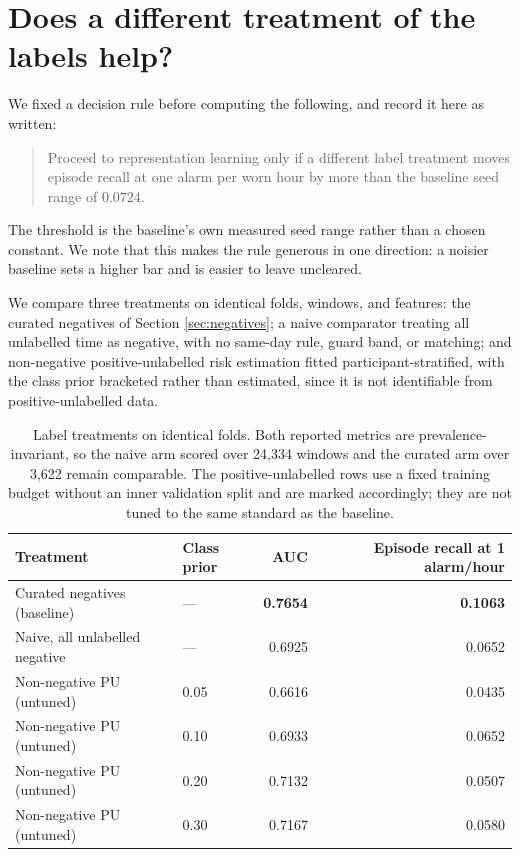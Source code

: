 \documentclass{article}
\begin{document}
\section{Does a different treatment of the labels help?}
\label{sec:pu}

We fixed a decision rule before computing the following, and record it here as
written:

\begin{quote}
Proceed to representation learning only if a different label treatment moves
episode recall at one alarm per worn hour by more than the baseline seed range
of $0.0724$.
\end{quote}

The threshold is the baseline's own measured seed range rather than a chosen
constant. We note that this makes the rule generous in one direction: a noisier
baseline sets a higher bar and is easier to leave uncleared.

We compare three treatments on identical folds, windows, and features: the
curated negatives of Section \ref{sec:negatives}; a naive comparator treating
all unlabelled time as negative, with no same-day rule, guard band, or
matching; and non-negative positive-unlabelled risk estimation
\cite{kiryo2017} fitted participant-stratified, with the class prior bracketed
rather than estimated, since it is not identifiable from positive-unlabelled
data.

\begin{table}[t]
\caption{Label treatments on identical folds. Both reported metrics are
prevalence-invariant, so the naive arm scored over 24{,}334 windows and the
curated arm over 3{,}622 remain comparable. The positive-unlabelled rows use a
fixed training budget without an inner validation split and are marked
accordingly; they are not tuned to the same standard as the baseline.}
\label{tab:pu}
\centering
\begin{tabular}{llrr}
\toprule
Treatment & Class prior & AUC & Episode recall at 1 alarm/hour \\
\midrule
Curated negatives (baseline) & --- & \textbf{0.7654} & \textbf{0.1063} \\
Naive, all unlabelled negative & --- & 0.6925 & 0.0652 \\
Non-negative PU (untuned) & 0.05 & 0.6616 & 0.0435 \\
Non-negative PU (untuned) & 0.10 & 0.6933 & 0.0652 \\
Non-negative PU (untuned) & 0.20 & 0.7132 & 0.0507 \\
Non-negative PU (untuned) & 0.30 & 0.7167 & 0.0580 \\
\bottomrule
\end{tabular}
\end{table}
\end{document}
